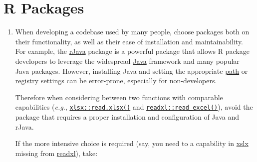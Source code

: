 \documentclass[]{book}
\begin{document}
\hypertarget{r-packages}{%
\section{R Packages}\label{r-packages}}

\begin{enumerate}
\def\labelenumi{\arabic{enumi}.}
\item
  When developing a codebase used by many people, choose packages both on their functionality, as well as their ease of installation and maintainability. For example, the \href{https://CRAN.R-project.org/package=rJava}{rJava} package is a powerful package that allows R package developers to leverage the widespread \href{https://www.java.com/en/}{Java} framework and many popular Java packages. However, installing Java and setting the appropriate \href{https://en.wikipedia.org/wiki/PATH_(variable)}{path} or \href{https://en.wikipedia.org/wiki/Windows_Registry}{registry} settings can be error-prone, especially for non-developers.

  Therefore when considering between two functions with comparable capabilities (\emph{e.g.}, \href{https://CRAN.R-project.org/package=xlsx}{\texttt{xlsx::read.xlsx()}} and \href{https://readxl.tidyverse.org/reference/read_excel.html}{\texttt{readxl::read\_excel()}}), avoid the package that requires a proper installation and configuration of Java and rJava.

  If the more intensive choice is required (say, you need to a capability in \href{https://CRAN.R-project.org/package=xlsx}{xslx} missing from \href{https://readxl.tidyverse.org/}{readxl}), take:


\end{enumerate}
\end{document}
